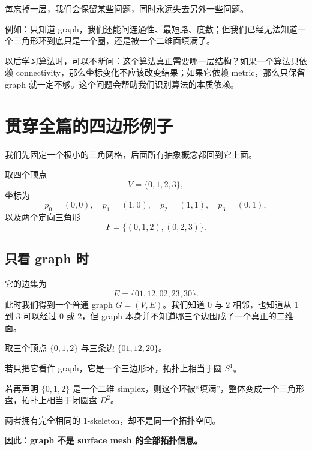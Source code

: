 \documentclass[UTF8,11pt]{ctexart}
\begin{document}
每忘掉一层，我们会保留某些问题，同时永远失去另外一些问题。

例如：只知道 graph，我们还能问连通性、最短路、度数；但我们已经无法知道一个三角形环到底只是一个圈，还是被一个二维面填满了。

\begin{keyidea}[：忘结构是一种诊断工具]
以后学习算法时，可以不断问：这个算法真正需要哪一层结构？如果一个算法只依赖 connectivity，那么坐标变化不应该改变结果；如果它依赖 metric，那么只保留 graph 就一定不够。这个问题会帮助我们识别算法的本质依赖。
\end{keyidea}

\section{贯穿全篇的四边形例子}

我们先固定一个极小的三角网格，后面所有抽象概念都回到它上面。

取四个顶点
\[
V=\{0,1,2,3\},
\]
坐标为
\[
p_0=(0,0),\quad p_1=(1,0),\quad p_2=(1,1),\quad p_3=(0,1),
\]
以及两个定向三角形
\[
F=\{(0,1,2),(0,2,3)\}.
\]

\begin{center}
\end{center}

\subsection{只看 graph 时}

它的边集为
\[
E=\{01,12,02,23,30\}.
\]
此时我们得到一个普通 graph $G=(V,E)$。我们知道 $0$ 与 $2$ 相邻，也知道从 $1$ 到 $3$ 可以经过 $0$ 或 $2$，但 graph 本身并不知道哪三个边围成了一个真正的二维面。

\begin{workedexample}[：一个三角形到底是圈还是面？]
取三个顶点 $\{0,1,2\}$ 与三条边 $\{01,12,20\}$。

若只把它看作 graph，它是一个三边形环，拓扑上相当于圆 $S^1$。

若再声明 $\{0,1,2\}$ 是一个二维 simplex，则这个环被“填满”，整体变成一个三角形盘，拓扑上相当于闭圆盘 $D^2$。

两者拥有完全相同的 1-skeleton，却不是同一个拓扑空间。

因此：\textbf{graph 不是 surface mesh 的全部拓扑信息。}
\end{workedexample}
\end{document}
